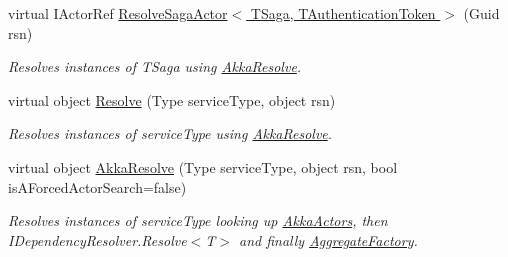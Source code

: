 \begin{DoxyCompactItemize}
virtual I\+Actor\+Ref \hyperlink{classCqrs_1_1Ninject_1_1Akka_1_1AkkaNinjectDependencyResolver_a56da352a605155a1d6572ddb76d9ceea_a56da352a605155a1d6572ddb76d9ceea}{Resolve\+Saga\+Actor$<$ T\+Saga, T\+Authentication\+Token $>$} (Guid rsn)
\begin{DoxyCompactList}\small\item\em Resolves instances of {\itshape T\+Saga}  using \hyperlink{classCqrs_1_1Ninject_1_1Akka_1_1AkkaNinjectDependencyResolver_a8e55618bf89a2c14bc3d0e7b3253f17d_a8e55618bf89a2c14bc3d0e7b3253f17d}{Akka\+Resolve}. \end{DoxyCompactList}\item 
virtual object \hyperlink{classCqrs_1_1Ninject_1_1Akka_1_1AkkaNinjectDependencyResolver_ab860d9bcf44b62098a8df91bbcb5013d_ab860d9bcf44b62098a8df91bbcb5013d}{Resolve} (Type service\+Type, object rsn)
\begin{DoxyCompactList}\small\item\em Resolves instances of {\itshape service\+Type}  using \hyperlink{classCqrs_1_1Ninject_1_1Akka_1_1AkkaNinjectDependencyResolver_a8e55618bf89a2c14bc3d0e7b3253f17d_a8e55618bf89a2c14bc3d0e7b3253f17d}{Akka\+Resolve}. \end{DoxyCompactList}\item 
virtual object \hyperlink{classCqrs_1_1Ninject_1_1Akka_1_1AkkaNinjectDependencyResolver_a8e55618bf89a2c14bc3d0e7b3253f17d_a8e55618bf89a2c14bc3d0e7b3253f17d}{Akka\+Resolve} (Type service\+Type, object rsn, bool is\+A\+Forced\+Actor\+Search=false)
\begin{DoxyCompactList}\small\item\em Resolves instances of {\itshape service\+Type}  looking up \hyperlink{classCqrs_1_1Ninject_1_1Akka_1_1AkkaNinjectDependencyResolver_acfe6512df9f871fa148fbf0866b3ba52_acfe6512df9f871fa148fbf0866b3ba52}{Akka\+Actors}, then I\+Dependency\+Resolver.\+Resolve$<$\+T$>$ and finally \hyperlink{classCqrs_1_1Ninject_1_1Akka_1_1AkkaNinjectDependencyResolver_afc2288a9aac598943df2a995b660d859_afc2288a9aac598943df2a995b660d859}{Aggregate\+Factory}. \end{DoxyCompactList}\end{DoxyCompactItemize}
